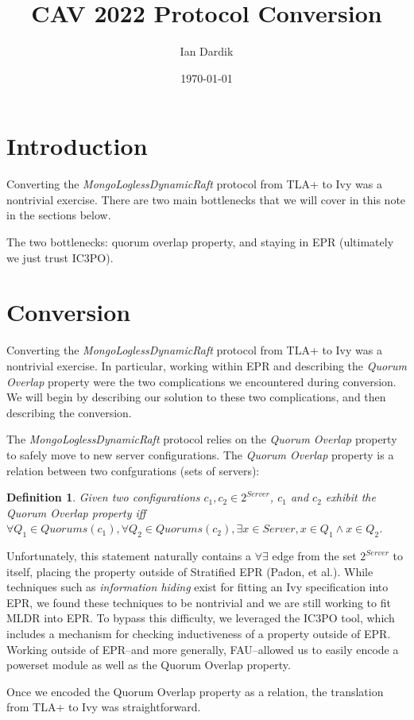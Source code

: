 \documentclass[12pt]{article}
\title{CAV 2022 Protocol Conversion}
\author{Ian Dardik}
\date{\today}
\newtheorem{definition}{Definition}
\begin{document}
\maketitle

\section{Introduction}
Converting the \textit{MongoLoglessDynamicRaft} protocol from TLA+ to Ivy was a nontrivial exercise.  There are two main bottlenecks that we will cover in this note in the sections below.

The two bottlenecks: quorum overlap property, and staying in EPR (ultimately we just trust IC3PO).

\section{Conversion}
Converting the \textit{MongoLoglessDynamicRaft} protocol from TLA+ to Ivy was a nontrivial exercise.  In particular, working within EPR and describing the \textit{Quorum Overlap} property were the two complications we encountered during conversion.  We will begin by describing our solution to these two complications, and then describing the conversion.

The \textit{MongoLoglessDynamicRaft} protocol relies on the \textit{Quorum Overlap} property to safely move to new server configurations.  The \textit{Quorum Overlap} property is a relation between two confgurations (sets of servers):
\begin{definition}
  Given two configurations $c_1, c_2 \in 2^{Server}$, $c_1$ and $c_2$ exhibit the \textit{Quorum Overlap} property iff $\forall Q_1 \in Quorums(c_1), \forall Q_2 \in Quorums(c_2), \exists x \in Server, x \in Q_1 \land x \in Q_2$.
\end{definition}

Unfortunately, this statement naturally contains a $\forall\exists$ edge from the set $2^{Server}$ to itself, placing the property outside of Stratified EPR (Padon, et al.).  While techniques such as \textit{information hiding} exist for fitting an Ivy specification into EPR, we found these techniques to be nontrivial and we are still working to fit MLDR into EPR.  To bypass this difficulty, we leveraged the IC3PO tool, which includes a mechanism for checking inductiveness of a property outside of EPR.  Working outside of EPR--and more generally, FAU--allowed us to easily encode a powerset module as well as the Quorum Overlap property.

Once we encoded the Quorum Overlap property as a relation, the translation from TLA+ to Ivy was straightforward.  
\end{document}
